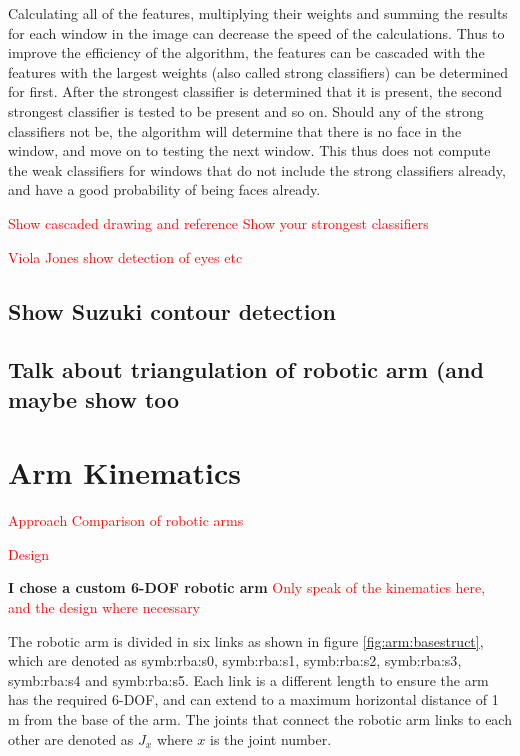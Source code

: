 \documentclass{article}
\newcommand{\rf}[1]{\textcolor{red}{#1}}
\newcommand{\sie}[1]{\text{\gls{symb:cameraMtx:#1}}}   %
\newcommand{\sba}[1]{\gls{symb:cameraMtx:#1}}          %
\newcommand{\imgsubsec}[2]{
    \graphicspath{ {./Images/#1/#2/} }
}
\newcommand{\symbsec}[1]{
    \renewcommand{\sie}[1]{\text{\gls{symb:#1:##1}}}
    \renewcommand{\sba}[1]{\gls{symb:#1:##1}}
}
\begin{document}
Calculating all of the features, multiplying their weights and summing the results for each window in the image can decrease the speed of the calculations.  Thus to improve the efficiency of the algorithm, the features can be cascaded with the features with the largest weights (also called strong classifiers) can be determined for first.  After the strongest classifier is determined that it is present, the second strongest classifier is tested to be present and so on.  Should any of the strong classifiers not be, the algorithm will determine that there is no face in the window, and move on to testing the next window.  This thus does not compute the weak classifiers for windows that do not include the strong classifiers already, and have a good probability of being faces already.

\rf{Show cascaded drawing and reference}
\rf{Show your strongest classifiers}

\rf{Viola Jones show detection of eyes etc}

\subsection{Show Suzuki contour detection}

\subsection{Talk about triangulation of robotic arm (and maybe show too}

\section{Arm Kinematics}

\rf{Approach}
\rf{Comparison of robotic arms}

\rf{Design}
\imgsubsec{RoboticArm}{Kinematics}
\textbf{I chose a custom 6-DOF robotic arm}
\rf{Only speak of the kinematics here, and the design where necessary}

\symbsec{rba}

The robotic arm is divided in six links as shown in figure \ref{fig:arm:basestruct}, which are denoted as \sba{s0}, \sba{s1}, \sba{s2}, \sba{s3}, \sba{s4} and \sba{s5}.  Each link is a different length to ensure the arm has the required 6-DOF, and can extend to a maximum horizontal distance of 1 m from the base of the arm.  The joints that connect the robotic arm links to each other are denoted as $J_x$ where $x$ is the joint number.  
\end{document}

